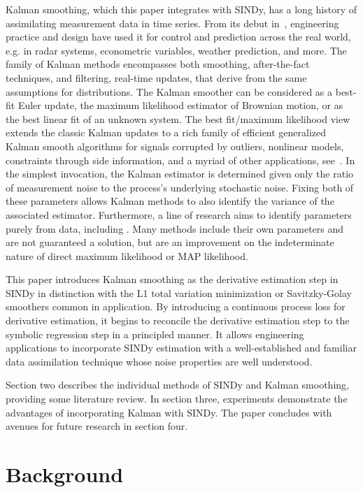 \documentclass{ACCESS_latex_template_20231118/ieeeaccess}
\begin{document}
Kalman smoothing, which this paper integrates with SINDy, has a long history of assimilating measurement data in time series.
From its debut in~\cite{kalman, KalBuc}, engineering practice and design have used it for control and prediction across the real world, e.g. in radar systems, econometric variables, weather prediction, and more.
The family of Kalman methods encompasses both smoothing, after-the-fact techniques, and filtering, real-time updates, that derive from the same assumptions for distributions.
The Kalman smoother can be considered as a best-fit Euler update, the maximum likelihood estimator of Brownian motion, or as the best linear fit of an unknown system.
The best fit/maximum likelihood view extends the classic Kalman updates to a rich family of efficient generalized Kalman smooth algorithms for signals corrupted by outliers, nonlinear models, constraints through side information, and a myriad of other applications, see~\cite{aravkin2017generalized,aravkin2012robust,jonker2019fast}.
In the simplest invocation, the Kalman estimator is determined given only the ratio of measurement noise to the process's underlying stochastic noise.
Fixing both of these parameters allows Kalman methods to also identify the variance of the associated estimator.
Furthermore, a line of research aims to identify parameters purely from data, including \cite{Barratt2020,VanBreugel2020,jonker2020efficient}.
Many methods include their own parameters and are not guaranteed a solution, but are an improvement on the indeterminate nature of direct maximum likelihood or MAP likelihood.

This paper introduces Kalman smoothing as the derivative estimation step in SINDy in distinction with the L1 total variation minimization or Savitzky-Golay smoothers common in application.
By introducing a continuous process loss for derivative estimation, it begins to reconcile the derivative estimation step to the symbolic regression step in a principled manner.
It allows engineering applications to incorporate SINDy estimation with a well-established and familiar data assimilation technique whose noise properties are well understood.

Section two describes the individual methods of SINDy and Kalman smoothing, providing some literature review.  In section three, experiments demonstrate the advantages of incorporating Kalman with SINDy.  The paper concludes with avenues for future research in section four.

\section{Background}
\end{document}
